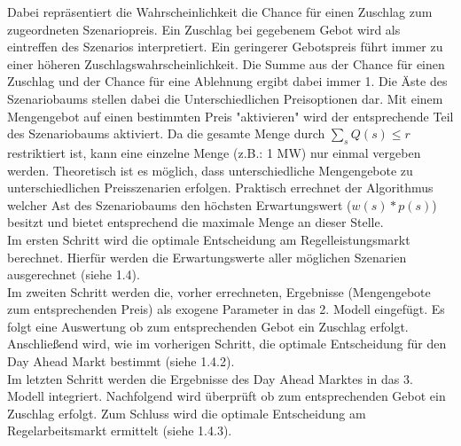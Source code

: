 Dabei repräsentiert die Wahrscheinlichkeit die Chance für einen Zuschlag zum zugeordneten Szenariopreis. Ein Zuschlag bei gegebenem Gebot wird als eintreffen des Szenarios interpretiert. Ein geringerer Gebotspreis führt immer zu einer höheren Zuschlagswahrscheinlichkeit. Die Summe aus der Chance für einen Zuschlag und der Chance für eine Ablehnung ergibt dabei immer 1. Die Äste des Szenariobaums stellen dabei die Unterschiedlichen Preisoptionen dar. Mit einem Mengengebot auf einen bestimmten Preis "aktivieren" wird der entsprechende Teil des Szenariobaums aktiviert. Da die gesamte Menge durch $\sum_s Q(s) \leq r$  restriktiert ist, kann eine einzelne Menge (z.B.: 1 MW) nur einmal vergeben werden. Theoretisch ist es möglich, dass unterschiedliche Mengengebote zu unterschiedlichen Preisszenarien erfolgen. Praktisch errechnet der Algorithmus welcher Ast des Szenariobaums den höchsten Erwartungswert ($w(s)*p(s)$) besitzt und bietet entsprechend die maximale Menge an dieser Stelle. \\

Im ersten Schritt wird die optimale Entscheidung am Regelleistungsmarkt berechnet. Hierfür werden die Erwartungswerte aller möglichen Szenarien ausgerechnet (siehe 1.4).\\

Im zweiten Schritt werden die, vorher errechneten, Ergebnisse (Mengengebote zum entsprechenden Preis) als exogene Parameter in das 2. Modell eingefügt. Es folgt eine Auswertung ob zum entsprechenden Gebot ein Zuschlag erfolgt. Anschließend wird, wie im vorherigen Schritt, die optimale Entscheidung für den Day Ahead Markt bestimmt (siehe 1.4.2).\\

Im letzten Schritt werden die Ergebnisse des Day Ahead Marktes in das 3. Modell integriert. Nachfolgend wird überprüft ob zum entsprechenden Gebot ein Zuschlag erfolgt. Zum Schluss wird die optimale Entscheidung am Regelarbeitsmarkt ermittelt (siehe 1.4.3).\\






